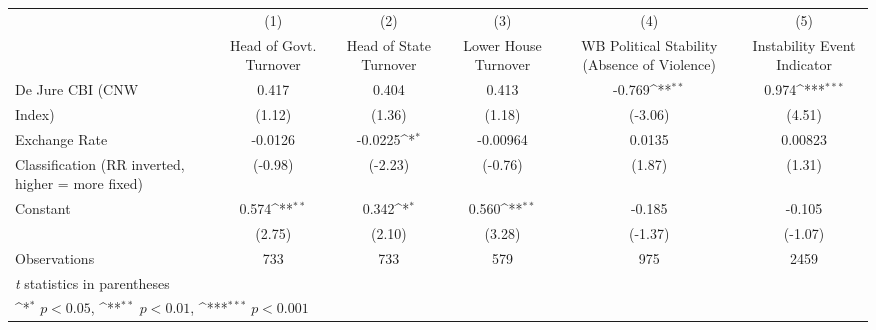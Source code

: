 {
\def\sym#1{\ifmmode^{#1}\else\(^{#1}\)\fi}
\begin{tabular}{l*{5}{c}}
\toprule
                &\multicolumn{1}{c}{(1)}&\multicolumn{1}{c}{(2)}&\multicolumn{1}{c}{(3)}&\multicolumn{1}{c}{(4)}&\multicolumn{1}{c}{(5)}\\
                &\multicolumn{1}{c}{Head of Govt. Turnover}&\multicolumn{1}{c}{Head of State Turnover}&\multicolumn{1}{c}{Lower House Turnover}&\multicolumn{1}{c}{WB Political Stability (Absence of Violence)}&\multicolumn{1}{c}{Instability Event Indicator}\\
\midrule
De Jure CBI (CNW&    0.417         &    0.404         &    0.413         &   -0.769\sym{**} &    0.974\sym{***}\\
Index)          &   (1.12)         &   (1.36)         &   (1.18)         &  (-3.06)         &   (4.51)         \\
\addlinespace
Exchange Rate   &  -0.0126         &  -0.0225\sym{*}  & -0.00964         &   0.0135         &  0.00823         \\
Classification (RR inverted, higher = more fixed)&  (-0.98)         &  (-2.23)         &  (-0.76)         &   (1.87)         &   (1.31)         \\
\addlinespace
Constant        &    0.574\sym{**} &    0.342\sym{*}  &    0.560\sym{**} &   -0.185         &   -0.105         \\
                &   (2.75)         &   (2.10)         &   (3.28)         &  (-1.37)         &  (-1.07)         \\
\midrule
Observations    &      733         &      733         &      579         &      975         &     2459         \\
\bottomrule
\multicolumn{6}{l}{\footnotesize \textit{t} statistics in parentheses}\\
\multicolumn{6}{l}{\footnotesize \sym{*} \(p<0.05\), \sym{**} \(p<0.01\), \sym{***} \(p<0.001\)}\\
\end{tabular}
}
